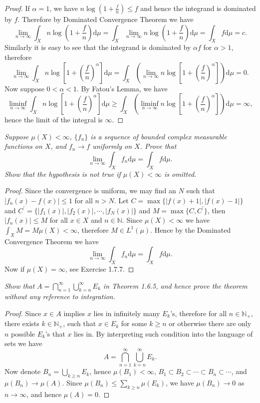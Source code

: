 \begin{proof}
If $\alpha=1$, we have $n\log \left( 1+\frac{f}{n} \right) \le f$ and hence the integrand is dominated by $f$. Therefore by Dominated Convergence Theorem we have 
$$
\lim_{n\rightarrow \infty} \int_X{n\log \left( 1+\frac{f}{n} \right) \mathrm{d}\mu}=\int_X{\lim_{n\rightarrow \infty} n\log \left( 1+\frac{f}{n} \right) \mathrm{d}\mu}=\int_X{f\mathrm{d}\mu}=c.
$$
Similarly it is easy to see that the integrand is dominated by $\alpha f$ for $\alpha>1$, therefore 
$$
\lim_{n\rightarrow \infty} \int_X{n\log \left[ 1+\left( \frac{f}{n} \right) ^{\alpha} \right] \mathrm{d}\mu}=\int_X{\left( \lim_{n\rightarrow \infty} n\log \left[ 1+\left( \frac{f}{n} \right) ^{\alpha} \right] \right) \mathrm{d}\mu}=0.
$$
Now suppose $0<\alpha<1$. By Fatou's Lemma, we have 
$$\liminf_{n\to\infty}\int_Xn\log\left[1+\left(\frac{f}{n}\right)^\alpha\right]\mathrm{d}\mu\ge\int_X\left(\liminf_{n\to\infty}n\log\left[1+\left(\frac{f}{n}\right)^\alpha\right]\right)\mathrm{d}\mu=\infty,$$
hence the limit of the integral is $\infty$.
\end{proof}
\begin{problem}\em
Suppose $\mu(X)<\infty$, $\{f_n\}$ is a sequence of bounded complex measurable functions on $X$, and $f_n\to f$ uniformly on $X$. Prove that 
$$
\lim_{n\rightarrow \infty} \int_X{f_n\mathrm{d}\mu}=\int_X{f\mathrm{d}\mu}.
$$
Show that the hypothesis is not true if $\mu(X)<\infty$ is omitted.
\end{problem}
\begin{proof}
Since the convergence is uniform, we may find an $N$ such that $|f_n(x)-f(x)|\le 1$ for all $n>N$. Let $C=\max\{|f(x)+1|,|f(x)-1|\}$ and $C^\prime=\{|f_1(x)|,|f_2(x)|,\cdots,|f_N(x)|\}$ and $M=\max\{C,C^\prime\}$, then $|f_n(x)|\le M$ for all $x\in X$ and $n\in\mathbb{N}$. Since $\mu(X)<\infty$ we have $\int_XM=M\mu(X)<\infty$, therefore $M\in L^1(\mu)$. Hence by the Dominated Convergence Theorem we have 
$$
\lim_{n\rightarrow \infty} \int_X{f_n\mathrm{d}\mu}=\int_X{f\mathrm{d}\mu}.
$$
Now if $\mu(X)=\infty$, see Exercise 1.7.7.
\end{proof}
\begin{problem}\em
Show that $A=\bigcap_{n=1}^\infty\bigcup_{k=n}^\infty E_k$ in Theorem 1.6.5, and hence prove the theorem without any reference to integration.
\end{problem}
\begin{proof}
Since $x\in A$ implies $x$ lies in infinitely many $E_k$'s, therefore for all $n\in\mathbb{N}_+$, there exists $k\in\mathbb{N}_+$, such that $x\in E_k$ for some $k\ge n$ or otherwise there are only $n$ possible $E_k$'s that $x$ lies in. By interpreting such condition into the language of sets we have 
$$A=\bigcap_{n=1}^\infty\bigcup_{k=n}^\infty E_k.$$
Now denote $B_n=\bigcup_{k\ge n}E_k$, hence $\mu(B_1)<\infty$, $B_1\subset B_2\subset\cdots\subset B_n\subset\cdots$, and $\mu(B_n)\to\mu(A)$. Since $\mu(B_n)\le\sum_{k\ge n}\mu(E_k)$, we have $\mu(B_n)\to 0$ as $n\to\infty$, and hence $\mu(A)=0$.
\end{proof}
